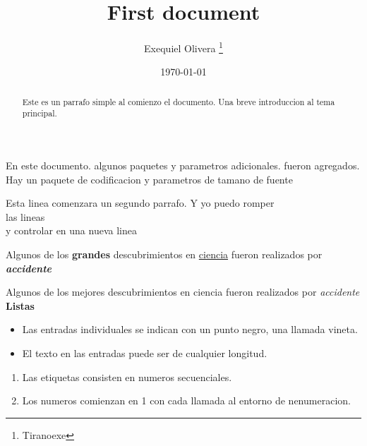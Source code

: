 \documentclass[]{article} %
\title{First document} %
\author{Exequiel Olivera \thanks{Tiranoexe}} %
\date{\today} %
\begin{document}
    \begin{titlepage}
        \maketitle
    \end{titlepage}

    \begin{abstract}
        Este es un parrafo simple al comienzo el documento. Una breve introduccion al tema principal.
    \end{abstract}
    
        En este documento. algunos paquetes y parametros adicionales. fueron agregados. Hay un paquete de codificacion y parametros de tamano de fuente

        Esta linea comenzara un segundo parrafo. Y yo puedo romper \\ las lineas \\ y controlar en una nueva linea

        Algunos de los \textbf{grandes} descubrimientos en \underline{ciencia} fueron realizados por \textbf{\textit{accidente}}

        Algunos de los mejores descubrimientos en ciencia fueron realizados por \emph{accidente}\\
        

        \pagebreak
        \textbf{Listas}
        \begin{itemize}
            \item Las entradas individuales se indican con un punto negro, una llamada vineta.
            \item   El texto en las entradas puede ser de cualquier longitud.
        \end{itemize}

        \begin{enumerate}
            \item Las etiquetas consisten en numeros secuenciales.
            \item Los numeros comienzan en 1 con cada llamada al entorno de nenumeracion.
        \end{enumerate}
\end{document}
